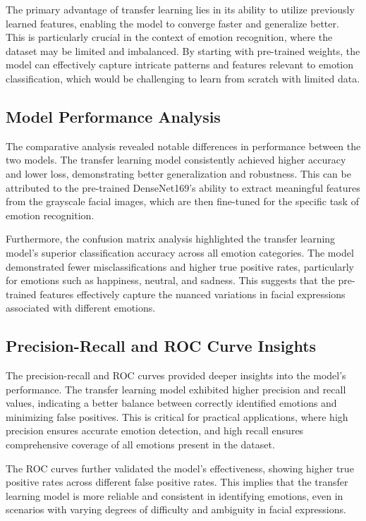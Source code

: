 \documentclass[conference]{IEEEtran}
\begin{document}
The primary advantage of transfer learning lies in its ability to utilize previously learned features, enabling the model to converge faster and generalize better. This is particularly crucial in the context of emotion recognition, where the dataset may be limited and imbalanced. By starting with pre-trained weights, the model can effectively capture intricate patterns and features relevant to emotion classification, which would be challenging to learn from scratch with limited data.

\subsection{Model Performance Analysis}
The comparative analysis revealed notable differences in performance between the two models. The transfer learning model consistently achieved higher accuracy and lower loss, demonstrating better generalization and robustness. This can be attributed to the pre-trained DenseNet169's ability to extract meaningful features from the grayscale facial images, which are then fine-tuned for the specific task of emotion recognition.

Furthermore, the confusion matrix analysis highlighted the transfer learning model's superior classification accuracy across all emotion categories. The model demonstrated fewer misclassifications and higher true positive rates, particularly for emotions such as happiness, neutral, and sadness. This suggests that the pre-trained features effectively capture the nuanced variations in facial expressions associated with different emotions.

\subsection{Precision-Recall and ROC Curve Insights}
The precision-recall and ROC curves provided deeper insights into the model's performance. The transfer learning model exhibited higher precision and recall values, indicating a better balance between correctly identified emotions and minimizing false positives. This is critical for practical applications, where high precision ensures accurate emotion detection, and high recall ensures comprehensive coverage of all emotions present in the dataset.

The ROC curves further validated the model's effectiveness, showing higher true positive rates across different false positive rates. This implies that the transfer learning model is more reliable and consistent in identifying emotions, even in scenarios with varying degrees of difficulty and ambiguity in facial expressions.
\end{document}
